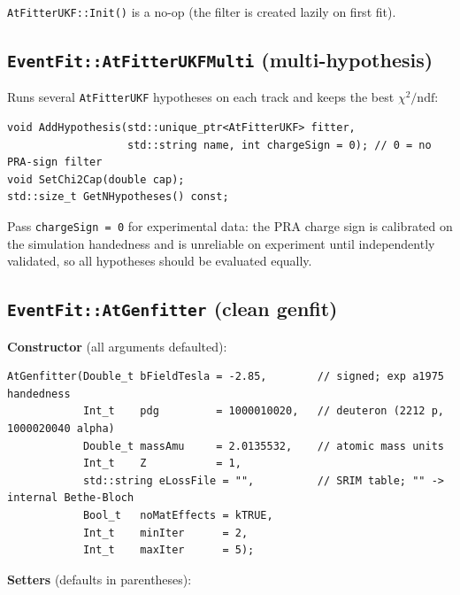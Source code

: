 \documentclass[11pt,a4paper]{article}
\newcommand{\code}[1]{\texttt{\small #1}}
\begin{document}
\code{AtFitterUKF::Init()} is a no-op (the filter is created lazily on first fit).

\subsection{\texttt{EventFit::AtFitterUKFMulti} (multi-hypothesis)}

Runs several \code{AtFitterUKF} hypotheses on each track and keeps the best
$\chi^2/\mathrm{ndf}$:

\begin{lstlisting}
void AddHypothesis(std::unique_ptr<AtFitterUKF> fitter,
                   std::string name, int chargeSign = 0); // 0 = no PRA-sign filter
void SetChi2Cap(double cap);
std::size_t GetNHypotheses() const;
\end{lstlisting}

\begin{notebox}
Pass \code{chargeSign = 0} for experimental data: the PRA charge sign is
calibrated on the simulation handedness and is unreliable on experiment until
independently validated, so all hypotheses should be evaluated equally.
\end{notebox}

\subsection{\texttt{EventFit::AtGenfitter} (clean genfit)}

\textbf{Constructor} (all arguments defaulted):
\begin{lstlisting}
AtGenfitter(Double_t bFieldTesla = -2.85,        // signed; exp a1975 handedness
            Int_t    pdg         = 1000010020,   // deuteron (2212 p, 1000020040 alpha)
            Double_t massAmu     = 2.0135532,    // atomic mass units
            Int_t    Z           = 1,
            std::string eLossFile = "",          // SRIM table; "" -> internal Bethe-Bloch
            Bool_t   noMatEffects = kTRUE,
            Int_t    minIter      = 2,
            Int_t    maxIter      = 5);
\end{lstlisting}

\textbf{Setters} (defaults in parentheses):
\end{document}
